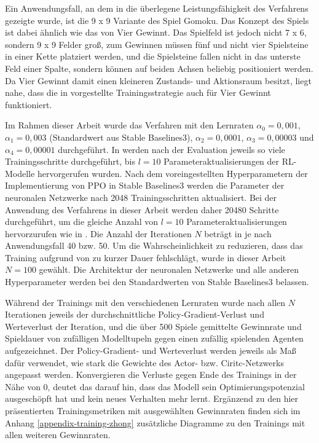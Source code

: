 Ein Anwendungsfall, an dem in \cite{Zhong.2020} die überlegene Leistungsfähigkeit des Verfahrens gezeigte wurde, ist die 9 x 9 Variante des Spiel Gomoku. Das Konzept des Spiels ist dabei ähnlich wie das von Vier Gewinnt. Das Spielfeld ist jedoch nicht 7 x 6, sondern 9 x 9 Felder groß, zum Gewinnen müssen fünf und nicht vier Spielsteine in einer Kette platziert werden, und die Spielsteine fallen nicht in das unterste Feld einer Spalte, sondern können auf beiden Achsen beliebig positioniert werden. Da Vier Gewinnt damit einen kleineren Zustands- und Aktionsraum besitzt, liegt nahe, dass die in \cite{Zhong.2020} vorgestellte Trainingsstrategie auch für Vier Gewinnt funktioniert.


Im Rahmen dieser Arbeit wurde das Verfahren mit den Lernraten $\alpha_0 = 0,001$, $\alpha_1 = 0,003$ (Standardwert aus Stable Baselines3), $\alpha_2 = 0,0001$, $\alpha_3 = 0,00003$ und $\alpha_4 = 0,00001$ durchgeführt. In \cite{Zhong.2020} werden nach der Evaluation jeweils so viele Trainingsschritte durchgeführt, bis $l = 10$ Parameteraktualisierungen der RL-Modelle hervorgerufen wurden. Nach dem voreingestellten Hyperparametern der Implementierung von PPO in Stable Baselines3 werden die Parameter der neuronalen Netzwerke nach 2048 Trainingsschritten aktualisiert. Bei der Anwendung des Verfahrens in dieser Arbeit werden daher 20480 Schritte durchgeführt, um die gleiche Anzahl von $l = 10$ Parameteraktualisierungen hervorzurufen wie in \cite{Zhong.2020}. Die Anzahl der Iterationen $N$ beträgt in \cite{Zhong.2020} je nach Anwendungsfall 40 bzw. 50. Um die Wahrscheinlichkeit zu reduzieren, dass das Training aufgrund von zu kurzer Dauer fehlschlägt, wurde in dieser Arbeit $N = 100$ gewählt. Die Architektur der neuronalen Netzwerke und alle anderen Hyperparameter werden bei den Standardwerten von Stable Baselines3 belassen.

Während der Trainings mit den verschiedenen Lernraten wurde nach allen $N$ Iterationen jeweils der durchschnittliche Policy-Gradient-Verlust und Werteverlust der Iteration, und die über 500 Spiele gemittelte Gewinnrate und Spieldauer von zufälligen Modelltupeln gegen einen zufällig spielenden Agenten aufgezeichnet. Der Policy-Gradient- und Werteverlust werden jeweils als Maß dafür verwendet, wie stark die Gewichte des Actor- bzw. Ciritc-Netzwerks angepasst werden. Konvergieren die Verluste gegen Ende des Trainings in der Nähe von 0, deutet das darauf hin, dass das Modell sein Optimierungspotenzial ausgeschöpft hat und kein neues Verhalten mehr lernt. Ergänzend zu den hier präsentierten Trainingsmetriken mit ausgewählten Gewinnraten finden sich im Anhang \ref{appendix-training-zhong} zusätzliche Diagramme zu den Trainings mit allen weiteren Gewinnraten.

